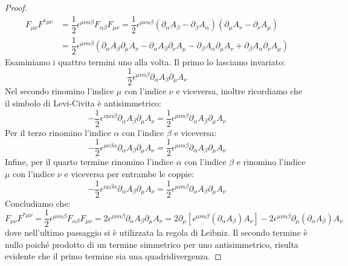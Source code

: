 \begin{proof}
    \begin{equation}
        \begin{aligned}
            F_{\mu\nu}F^{*\mu\nu}&=\dfrac{1}{2}\epsilon^{\mu\nu\alpha\beta}F_{\alpha\beta}F_{\mu\nu}=\dfrac{1}{2}\epsilon^{\mu\nu\alpha\beta}(\partial_\alpha A_\beta-\partial_\beta A_\alpha)(\partial_\mu A_\nu-\partial_\nu A_\mu)\\
            &=\dfrac{1}{2}\epsilon^{\mu\nu\alpha\beta}(\partial_\alpha A_\beta\partial_\mu A_\nu-\partial_\alpha A_\beta\partial_\nu A_\mu-\partial_\beta A_\alpha\partial_\mu A_\nu+\partial_\beta A_\alpha\partial_\nu A_\mu)
        \end{aligned}
    \end{equation}
    Esaminiamo i quattro termini uno alla volta. Il primo lo lasciamo invariato:
    \begin{equation}
        \dfrac{1}{2}\epsilon^{\mu\nu\alpha\beta}\partial_\alpha A_\beta\partial_\mu A_\nu
    \end{equation}
Nel secondo rinomino l'indice $\mu$ con l'indice $\nu$ e viceversa, inoltre ricordiamo che il simbolo di Levi-Civita è antisimmetrico:
\begin{equation}
        - \dfrac{1}{2}\epsilon^{\nu\mu\alpha\beta}\partial_\alpha A_\beta\partial_\mu A_\nu=\dfrac{1}{2}\epsilon^{\mu\nu\alpha\beta}\partial_\alpha A_\beta\partial_\mu A_\nu
    \end{equation}
Per il terzo rinomino l'indice $\alpha$ con l'indice $\beta$ e viceversa:
\begin{equation}
        - \dfrac{1}{2}\epsilon^{\mu\nu\beta\alpha}\partial_\alpha A_\beta\partial_\mu A_\nu=\dfrac{1}{2}\epsilon^{\mu\nu\alpha\beta}\partial_\alpha A_\beta\partial_\mu A_\nu
    \end{equation}
    Infine, per il quarto termine rinomino l'indice $\alpha$ con l'indice $\beta$ e rinomino l'indice $\mu$ con l'indice $\nu$ e viceversa per entrambe le coppie:
\begin{equation}
        - \dfrac{1}{2}\epsilon^{\nu\mu\beta\alpha}\partial_\alpha A_\beta\partial_\mu A_\nu=\dfrac{1}{2}\epsilon^{\mu\nu\alpha\beta}\partial_\alpha A_\beta\partial_\mu A_\nu
    \end{equation}
Concludiamo che:
\begin{equation}
        F_{\mu\nu}F^{*\mu\nu}=\dfrac{1}{2}\epsilon^{\mu\nu\alpha\beta}F_{\alpha\beta}F_{\mu\nu}=2\epsilon^{\mu\nu\alpha\beta}\partial_\alpha A_\beta\partial_\mu A_\nu=2\partial_\mu[\epsilon^{\mu\nu\alpha\beta}(\partial_\alpha A_\beta) A_\nu]-2\epsilon^{\mu\nu\alpha\beta}\partial_\mu(\partial_\alpha A_\beta)  A_\nu
    \end{equation}
dove nell'ultimo passaggio si è utilizzata la regola di Leibniz. Il secondo termine è nullo poiché prodotto di un termine simmetrico per uno antisimmetrico, risulta evidente che il primo termine sia una quadridivergenza.    
\end{proof}

